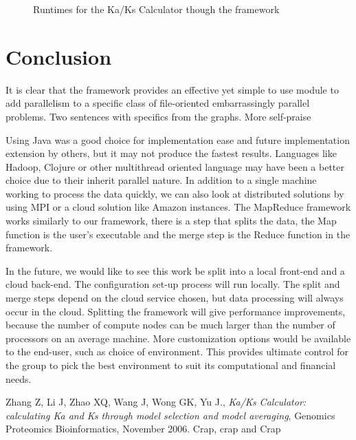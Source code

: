 \documentclass[12pt]{article}
\begin{document}
\begin{figure}
{}
\caption{Runtimes for the Ka/Ks Calculator though the framework}
\label{fig:octugraph}
\end{figure}

\section{Conclusion}

It is clear that the framework provides an effective yet simple to use module to
add parallelism to a specific class of file-oriented embarrassingly parallel
problems. Two sentences with specifics from the graphs. More self-praise 

Using Java was a good choice for implementation ease and future implementation
extension by others, but it may not produce the fastest results. Languages like
Hadoop, Clojure or other multithread oriented language may have been a better
choice due to their inherit parallel nature. In addition to a single machine
working to process the data quickly, we can also look at distributed solutions
by using MPI or a cloud solution like Amazon instances. The MapReduce framework
works similarly to our framework, there is a step that splits the data, the Map
function is the user's executable and the merge step is the Reduce function in
the framework. 

In the future, we would like to see this work be split into a local front-end
and a cloud back-end. The configuration set-up process will run locally. The
split and merge steps depend on the cloud service chosen, but data processing
will always occur in the cloud. Splitting the framework will give performance
improvements, because the number of compute nodes can be much larger than the
number of processors on an average machine. More customization options would be
available to the end-user, such as choice of environment. This provides ultimate
control for the group to pick the best environment to suit its computational and
financial needs.

\begin{thebibliography}{1}
Zhang Z, Li J, Zhao XQ, Wang J, Wong GK, Yu J., \emph{Ka/Ks Calculator: 
calculating Ka and Ks through model selection and model averaging},
Genomics Proteomics Bioinformatics, November 2006.
Crap, crap and Crap
\end{thebibliography}
\end{document}
